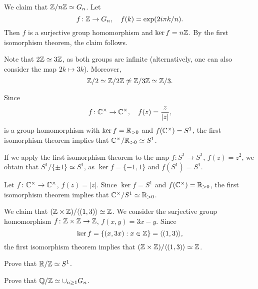 \begin{example}
We claim that $\mathbb{Z}/n\mathbb{Z}\simeq G_n$. Let 
\[
f\colon\mathbb{Z}\to G_n,\quad
f(k)=\exp(2i\pi k/n).
\]
Then $f$ is a surjective group homomorphism and
$\ker f=n\mathbb{Z}$. By the first isomorphism theorem, the claim follows. 
\end{example}

\begin{example}
Note that $2\mathbb{Z}\simeq 3\mathbb{Z}$, as both groups are infinite (alternatively, one can also consider the map $2k\mapsto 3k$). Moreover, 
\[
\mathbb{Z}/2\simeq\mathbb{Z}/2\mathbb{Z}\not\simeq\mathbb{Z}/3\mathbb{Z}\simeq\mathbb{Z}/3.
\]
\end{example}

\begin{example}
Since 
\[
f\colon\mathbb{C}^\times\to\mathbb{C}^\times,
\quad
f(z)=\frac{z}{|z|},
\]
is a group homomorphism with $\ker f=\mathbb{R}_{>0}$ and
$f(\mathbb{C}^\times)=S^1$, the first isomorphism theorem 
implies that 
$\mathbb{C}^\times/\mathbb{R}_{>0}\simeq S^1$.
\end{example}

\begin{example}
If we apply the first isomorphism theorem to the
map $f\colon S^1\to S^1$, $f(z)=z^2$, we obtain that 
$S^1/\{\pm1\}\simeq S^1$, as 
$\ker f=\{-1,1\}$ and $f(S^1)=S^1$.
\end{example}

\begin{example}
Let $f\colon\mathbb{C}^\times\to\mathbb{C}^\times$, $f(z)=|z|$. Since $\ker f=S^1$ and $f(\mathbb{C}^\times)=\mathbb{R}_{>0}$, the first isomorphism theorem 
implies that $\mathbb{C}^\times/S^1\simeq\mathbb{R}_{>0}$.
\end{example}

\begin{example}
We claim that 
$(\mathbb{Z}\times\mathbb{Z})/\langle (1,3)\rangle\simeq\mathbb{Z}$. We consider
the surjective group homomorphism 
$f\colon\mathbb{Z}\times\mathbb{Z}\to\mathbb{Z}$, $f(x,y)=3x-y$. Since 
\[
\ker f=\{(x,3x):x\in\mathbb{Z}\}=\langle (1,3)\rangle,
\]
the first isomorphism theorem implies that 
$(\mathbb{Z}\times\mathbb{Z})/\langle (1,3)\rangle\simeq\mathbb{Z}$.
\end{example}

\begin{exercise}
Prove that $\mathbb{R}/\mathbb{Z}\simeq S^1$.
\end{exercise}



\begin{exercise}
Prove that $\mathbb{Q}/\mathbb{Z}\simeq\cup_{n\geq1}G_n$.
\end{exercise}


